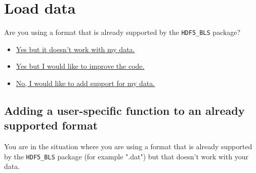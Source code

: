 \documentclass{book}
\begin{document}
    \section{Load data} \label{sec:load_data}

        \begin{tcolorbox}
            Are you using a format that is already supported by the \texttt{HDF5\_BLS} package?
            \begin{itemize}
                \item \hyperref[subsec:load_data.user_specific]{Yes but it doesn't work with my data.}
                \item \hyperref[subsec:load_data.improvement]{Yes but I would like to improve the code.}
                \item \hyperref[subsec:load_data.new_format]{No, I would like to add support for my data.}
            \end{itemize}
        \end{tcolorbox}

        \subsection{Adding a user-specific function to an already supported format} \label{subsec:load_data.user_specific}

            \begin{tcolorbox}
                You are in the situation where you are using a format that is already supported by the \texttt{HDF5\_BLS} package (for example ".dat") but that doesn't work with your data.
            \end{tcolorbox}
\end{document}
